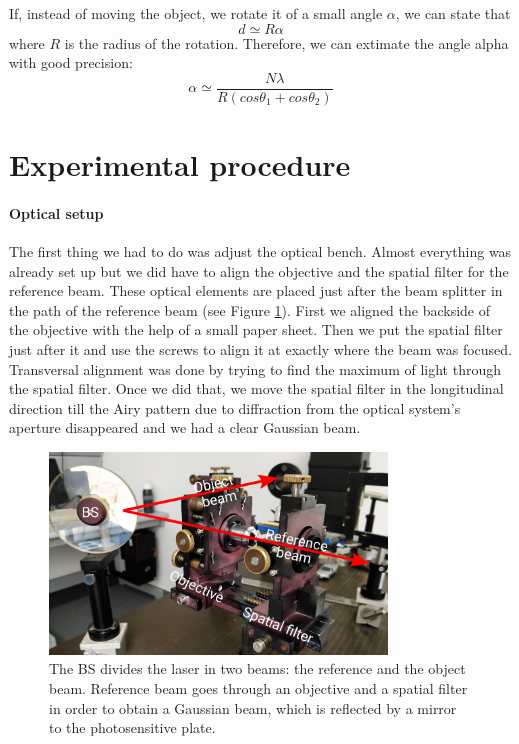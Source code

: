 \documentclass[11pt,a4paper]{article}
\begin{document}
If, instead of moving the object, we rotate it of a small angle $\alpha$, we can state that
\begin{equation}
d\simeq R\alpha
\end{equation}
where $R$ is the radius of the rotation. Therefore, we can extimate the angle alpha with good precision:
\begin{equation}
\alpha\simeq \frac{N\lambda}{R(cos\theta_1+cos\theta_2)}\label{eq:alp}
\end{equation}

\section{Experimental procedure}

\paragraph{Optical setup}
The first thing we had to do was adjust the optical bench. Almost everything was already set up but we did have to align the objective and the spatial filter for the reference beam. These optical elements are placed just after the beam splitter in the path of the reference beam (see Figure \ref{fig:optical_bench_1}). First we aligned the backside of the objective with the help of a small paper sheet. Then we put the spatial filter just after it and use the screws to align it at exactly where the beam was focused. Transversal alignment was done by trying to find the maximum of light through the spatial filter. Once we did that, we move the spatial filter in the longitudinal direction till the Airy pattern due to diffraction from the optical system's aperture disappeared and we had a clear Gaussian beam.

\begin{figure}[ht]
\centering
\includegraphics[width=0.8\textwidth]{Optical_bench_1}
\caption{The BS divides the laser in two beams: the reference and the object beam. Reference beam goes through an objective and a spatial filter in order to obtain a Gaussian beam, which is reflected by a mirror to the photosensitive plate.}
\label{fig:optical_bench_1}
\end{figure}
\end{document}
